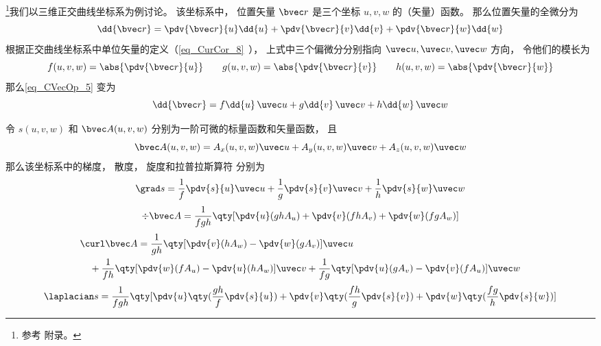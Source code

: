 

\footnote{参考 \cite{GriffE} 附录。}我们以三维正交曲线坐标系为例讨论。 该坐标系中， 位置矢量 $\bvec r$ 是三个坐标 $u, v, w$ 的（矢量）函数。 那么位置矢量的全微分为
\begin{equation}\label{eq_CVecOp_5}
\dd{\bvec r} = \pdv{\bvec r}{u}\dd{u} + \pdv{\bvec r}{v}\dd{v} + \pdv{\bvec r}{w}\dd{w}
\end{equation}
根据正交曲线坐标系中单位矢量的定义（\autoref{eq_CurCor_8}~）， 上式中三个偏微分分别指向 $\uvec u, \uvec v, \uvec w$ 方向， 令他们的模长为
\begin{equation}
f(u,v,w) = \abs{\pdv{\bvec r}{u}} \qquad
g(u,v,w) = \abs{\pdv{\bvec r}{v}} \qquad
h(u,v,w) = \abs{\pdv{\bvec r}{w}}
\end{equation}
那么\autoref{eq_CVecOp_5} 变为
\begin{equation}\label{eq_CVecOp_4}
\dd{\bvec r} = f\dd{u}\,\uvec u + g\dd{v}\,\uvec v + h\dd{w}\,\uvec w
\end{equation}


令 $s(u, v, w)$ 和 $\bvec A(u, v, w)$ 分别为一阶可微的标量函数和矢量函数， 且
\begin{equation}\label{eq_CVecOp_7}
\bvec A(u, v, w) = A_x(u, v, w)\uvec u + A_y(u, v, w)\uvec v + A_z(u, v, w)\uvec w
\end{equation}
那么该坐标系中的梯度， 散度， 旋度和拉普拉斯算符 分别为
\begin{equation}\label{eq_CVecOp_1}
\grad s = \frac{1}{f} \pdv{s}{u}\uvec u + \frac{1}{g}\pdv{s}{v} \uvec v + \frac{1}{h} \pdv{s}{w}\uvec w
\end{equation}
\begin{equation}\label{eq_CVecOp_2}
\div \bvec A = \frac{1}{fgh}\qty[\pdv{u}(ghA_u) + \pdv{v}(fhA_v) + \pdv{w}(fgA_w)]
\end{equation}
\begin{equation}\label{eq_CVecOp_3}
\begin{aligned}
&\curl \bvec A = \frac{1}{gh}\qty[\pdv{v}(hA_w) - \pdv{w}(gA_v)]\uvec u\\
&\quad + \frac{1}{fh}\qty[\pdv{w}(fA_u) - \pdv{u}(hA_w)]\uvec v
+ \frac{1}{fg}\qty[\pdv{u}(gA_v) - \pdv{v}(fA_u)]\uvec w
\end{aligned}
\end{equation}
\begin{equation}\label{eq_CVecOp_6}
\laplacian s = \frac{1}{fgh}\qty[\pdv{u}\qty(\frac{gh}{f}\pdv{s}{u}) + \pdv{v}\qty(\frac{fh}{g}\pdv{s}{v}) + \pdv{w}\qty(\frac{fg}{h}\pdv{s}{w})]
\end{equation}

